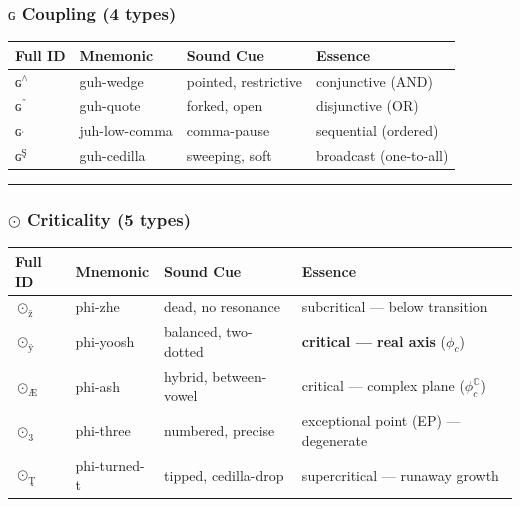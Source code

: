 \documentclass[12pt,a4paper]{article}
\begin{document}
\subsubsection{$ɢ$ Coupling (4 types)}

\begin{table}[htbp]
\centering
\small
{}
\begin{tabularx}{\textwidth}{>{\centering\arraybackslash}X >{\centering\arraybackslash}X >{\centering\arraybackslash}X >{\centering\arraybackslash}X}
\toprule
\rowcolor{gray!25}\textbf{Full ID} & \textbf{Mnemonic} & \textbf{Sound Cue} & \textbf{Essence} \\
\midrule
\rowcolors{1}{white}{gray!10}
$ɢ^{\wedge}$ & guh-wedge & pointed, restrictive & conjunctive (AND) \\
$ɢ^{\text{˝}}$ & guh-quote & forked, open & disjunctive (OR) \\
$ɢ^{\text{ˌ}}$ & juh-low-comma & comma-pause & sequential (ordered) \\
$ɢ^{\text{Ş}}$ & guh-cedilla & sweeping, soft & broadcast (one-to-all) \\
\bottomrule
\end{tabularx}
\end{table}

\begin{center}
\rule{0.5\textwidth}{0.4pt}
\end{center}

\subsubsection{$⊙$ Criticality (5 types)}

\begin{table}[htbp]
\centering
\small
{}
\begin{tabularx}{\textwidth}{>{\centering\arraybackslash}X >{\centering\arraybackslash}X >{\centering\arraybackslash}X >{\centering\arraybackslash}X}
\toprule
\rowcolor{gray!25}\textbf{Full ID} & \textbf{Mnemonic} & \textbf{Sound Cue} & \textbf{Essence} \\
\midrule
\rowcolors{1}{white}{gray!10}
$⊙_{\text{ž}}$ & phi-zhe & dead, no resonance & subcritical --- below transition \\
$⊙_{\text{ÿ}}$ & phi-yoosh & balanced, two-dotted & \textbf{critical --- real axis} ($\phi_c$) \\
$⊙_{\text{Æ}}$ & phi-ash & hybrid, between-vowel & critical --- complex plane ($\phi_c^{\mathbb{C}}$) \\
$⊙_{3}$ & phi-three & numbered, precise & exceptional point (EP) --- degenerate \\
$⊙_{\text{Ţ}}$ & phi-turned-t & tipped, cedilla-drop & supercritical --- runaway growth \\
\bottomrule
\end{tabularx}
\end{table}
\end{document}
